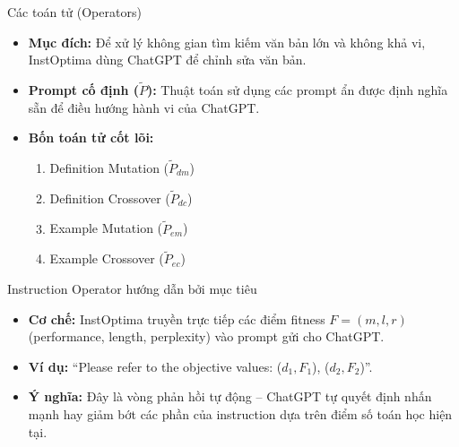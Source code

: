 \documentclass[12pt,xcolor=table]{beamer}
\begin{document}
\begin{frame}{Các toán tử (Operators)}
    \begin{itemize}
        \item \textbf{Mục đích:} Để xử lý không gian tìm kiếm văn bản lớn và không khả vi, InstOptima dùng ChatGPT để chỉnh sửa văn bản.
        \item \textbf{Prompt cố định ($\tilde{P}$):} Thuật toán sử dụng các prompt ẩn được định nghĩa sẵn để điều hướng hành vi của ChatGPT.
        \item \textbf{Bốn toán tử cốt lõi:}
        \begin{enumerate}
            \item Definition Mutation ($\tilde{P}_{dm}$)
            \item Definition Crossover ($\tilde{P}_{dc}$)
            \item Example Mutation ($\tilde{P}_{em}$)
            \item Example Crossover ($\tilde{P}_{ec}$)
        \end{enumerate}
    \end{itemize}
\end{frame}

\begin{frame}{Instruction Operator hướng dẫn bởi mục tiêu}
    \begin{itemize}
        \item \textbf{Cơ chế:} InstOptima truyền trực tiếp các điểm fitness $F = (m, l, r)$ (performance, length, perplexity) vào prompt gửi cho ChatGPT.
        \item \textbf{Ví dụ:} ``Please refer to the objective values: ($d_1, F_1$), ($d_2, F_2$)''.
        \item \textbf{Ý nghĩa:} Đây là vòng phản hồi tự động -- ChatGPT tự quyết định nhấn mạnh hay giảm bớt các phần của instruction dựa trên điểm số toán học hiện tại.
    \end{itemize}
\end{frame}

\end{document}
